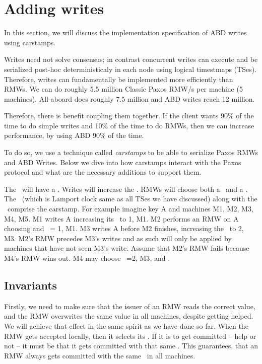 \section{Adding writes} \label{sec:writes}

In this section, we will discuss the implementation specification of ABD writes using carstamps. %

Writes need not solve consensus; in contrast concurrent writes can execute and be serialized post-hoc deterministicaly in each node using logical timestmaps (\ie TSes). Therefore, writes can fundamentally be implemented more efficiently than RMWs.
We can do roughly 5.5 million Classic Paxos RMW/s per machine (5 machines).
All-aboard does roughly 7.5 million and ABD writes reach 12 million.


Therefore, there is benefit coupling them together.
If the client wants 90\% of the time to do simple writes and 10\% of the time to do RMWs, then we can increase performance, by using ABD 90\% of the time. 

To do so, we use a technique called \emph{carstamps} to be able to serialize Paxos RMWs and ABD Writes.  
Below we dive into how carstamps interact with the Paxos protocol and what are the necessary additions to support them.

\custvspace
{}
The \kv~will have a \basets. Writes will increase the \basets. RMWs will choose both a \logno~and a \basets. The  \basets\ (which is Lamport clock same as all TSes we have discussed) along with the \logno\ comprise the carstamp. For example imagine key A and machines M1, M2, M3, M4, M5. M1 writes A increasing its \basets~to {1, M1}. M2 performs an RMW on A choosing  and \basets~= {1, M1}. M3 writes A before M2 finishes, increasing the \basets~to {2, M3}. M2's RMW precedes M3's writes and as such will only be applied by machines that have not seen M3's write. Assume that M2's RMW fails because M4's RMW wins out. M4 may choose \basets~={2, M3}, and .


\subsection{Invariants}
Firstly, we need to make sure that the issuer of an RMW reads the correct value, and the RMW overwrites the same value in all machines, despite getting helped.
We will achieve that effect in the same spirit as we have done so far.
When the RMW gets accepted locally, then it selects its \basets. If it is to get committed -- help or not -- it must be that it gets committed with that same \basets. This guarantees, that an RMW always gets committed with the same \basets~in all machines.

